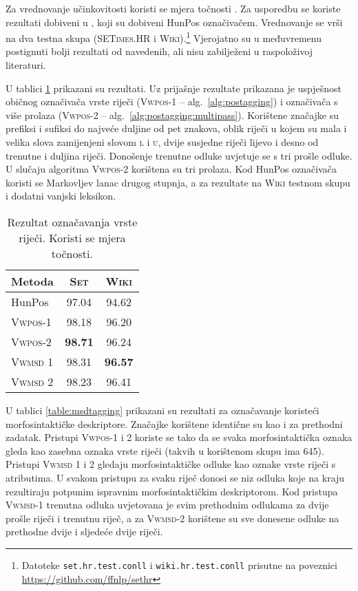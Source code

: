 Za vrednovanje učinkovitosti koristi se mjera točnosti . Za
usporedbu se koriste rezultati dobiveni u \citep{agic2013lemmatization}, koji su
dobiveni HunPos označivačem. Vrednovanje se vrši na dva testna skupa
(\textsc{SETimes.HR} i \textsc{Wiki}).\footnote{Datoteke
\texttt{set.hr.test.conll} i \texttt{wiki.hr.test.conll} prisutne na poveznici
\url{https://github.com/ffnlp/sethr}} Vjerojatno su u međuvremenu postignuti
bolji rezultati od navedenih, ali nisu zabilježeni u raspoloživoj literaturi.

U tablici \ref{table:postagging} prikazani su rezultati. Uz prijašnje rezultate
prikazana je uspješnost običnog označivača vrste riječi (\textsc{Vwpos-1} --
alg.~\ref{alg:postagging}) i označivača s više prolaza (\textsc{Vwpos-2} --
alg.~\ref{alg:postagging:multipass}). Korištene značajke su prefiksi i sufiksi
do najveće duljine od pet znakova, oblik riječi u kojem su mala i velika slova
zamijenjeni slovom \textsc{l} i \textsc{u}, dvije susjedne riječi lijevo i desno
od trenutne i duljina riječi. Donošenje trenutne odluke uvjetuje se s tri prošle
odluke. U slučaju algoritma \textsc{Vwpos-2} korištena su tri prolaza. Kod HunPos
označivača koristi se Markovljev lanac drugog stupnja, a za rezultate na
\textsc{Wiki} testnom skupu i dodatni vanjski leksikon.

\begin{table}
\centering
\caption[Rezultat označavanja vrste riječi.]{Rezultat označavanja vrste riječi.
Koristi se mjera točnosti.}
\label{table:postagging}
\begin{tabular}{|l|c|c|}
\hline
Metoda                               & \textsc{Set}   & \textsc{Wiki}  \\ \hline \hline
HunPos \citep{agic2013lemmatization} & 97.04          & 94.62          \\
\textsc{Vwpos-1}                     & 98.18          & 96.20          \\
\textsc{Vwpos-2}                     & \textbf{98.71} & 96.24          \\
\textsc{Vwmsd} 1                     & 98.31          & \textbf{96.57} \\
\textsc{Vwmsd} 2                     & 98.23          & 96.41          \\ \hline
\end{tabular}
\end{table}

U tablici \ref{table:msdtagging} prikazani su rezultati za označavanje koristeći
morfosintaktičke deskriptore. Značajke korištene identične su kao i za prethodni
zadatak. Pristupi \textsc{Vwpos-1} i \textsc{2} koriste se tako da se svaka
morfosintaktička oznaka gleda kao zasebna oznaka vrste riječi (takvih u
korištenom skupu ima 645). Pristupi \textsc{Vwmsd} 1 i 2 gledaju
morfosintaktičke odluke kao oznake vrste riječi s atributima. U svakom pristupu
za svaku riječ donosi se niz odluka koje na kraju rezultiraju potpunim ispravnim
morfosintaktičkim deskriptorom.  Kod pristupa \textsc{Vwmsd-1} trenutna odluka
uvjetovana je svim prethodnim odlukama za dvije prošle riječi i trenutnu riječ,
a za \textsc{Vwmsd-2} korištene su sve donesene odluke na prethodne dvije i
sljedeće dvije riječi.

